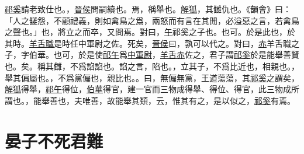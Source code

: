 \documentclass{article}
\newcommand{\tsu}{\small\kaishu\color{brown}}
\begin{document}
\uline{祁奚}請老{\tsu 致仕也。}，\uline{晉侯}問嗣{\tsu 續也。}焉，稱{\tsu 舉也。}\uline{解狐}，其讎{\tsu 仇也。《韻會》曰：「人之讎怨，不顧禮義，則如禽鳥之爲，兩怒而有言在其閒，必溢惡之言，若禽鳥之聲也。」}也，將立之而卒，又問焉。對曰，\uline{午}{\tsu 祁奚之子也。}也可。於是{\tsu 此也，於其時。}\uline{羊舌職}{\tsu 是時任中軍尉之佐。}死矣，\uline{晉侯}曰，孰可以代之。對曰，\uline{赤}{\tsu 羊舌職之子，字伯華。}也可，於是使\uline{祁午}爲\uline{中軍尉}，\uline{羊舌赤}佐之，君子謂\uline{祁奚}於是能舉善{\tsu 賢也。}矣。稱其讎，不爲諂{\tsu 諂也。諂之言，陷也。}，立其子，不爲比{\tsu 近也，相親也。}，舉其偏{\tsu 屬也。}，不爲黨{\tsu 偏也，親比也。}。曰，無偏無黨，王道蕩蕩，其\uline{祁奚}之謂矣，\uline{解狐}得舉，\uline{祁午}得位，\uline{伯華}得官，建一官而三物成{\tsu 得舉、得位、得官，此三物成所謂也。}，能舉善也，夫唯善，故能舉其類，云，惟其有之，是以似之，\uline{祁奚}有焉。

\section{晏子不死君難}

\noindent{\tsu 襄公二十五年}
\end{document}
